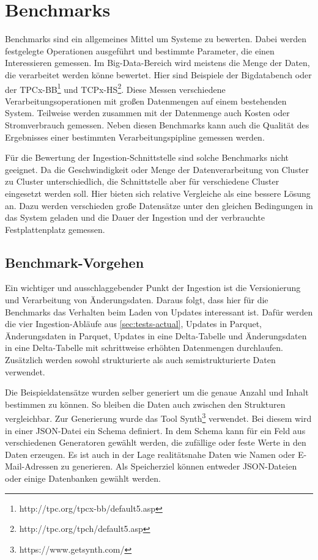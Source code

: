 \section{Benchmarks}

Benchmarks sind ein allgemeines Mittel um Systeme zu bewerten.
Dabei werden festgelegte Operationen ausgeführt und bestimmte Parameter, die einen Interessieren gemessen.
Im Big-Data-Bereich wird meistens die Menge der Daten, die verarbeitet werden könne bewertet.
Hier sind Beispiele der Bigdatabench \parencite{bigdatabench} oder der TPCx-BB\footnote{http://tpc.org/tpcx-bb/default5.asp} und TCPx-HS\footnote{http://tpc.org/tpch/default5.asp}.
Diese Messen verschiedene Verarbeitungsoperationen mit großen Datenmengen auf einem bestehenden System.
Teilweise werden zusammen mit der Datenmenge auch Kosten oder Stromverbrauch gemessen.
Neben diesen Benchmarks kann auch die Qualität des Ergebnisses einer bestimmten Verarbeitungspipline gemessen werden.

Für die Bewertung der Ingestion-Schnittstelle sind solche Benchmarks nicht geeignet.
Da die Geschwindigkeit oder Menge der Datenverarbeitung von Cluster zu Cluster unterschiedlich, die Schnittstelle aber für verschiedene Cluster eingesetzt werden soll.
Hier bieten sich relative Vergleiche als eine bessere Lösung an.
Dazu werden verschieden große Datensätze unter den gleichen Bedingungen in das System geladen und die Dauer der Ingestion und der verbrauchte Festplattenplatz gemessen.

\subsection{Benchmark-Vorgehen}
Ein wichtiger und ausschlaggebender Punkt der Ingestion ist die Versionierung und Verarbeitung von Änderungsdaten.
Daraus folgt, dass hier für die Benchmarks das Verhalten beim Laden von Updates interessant ist.
Dafür werden die vier Ingestion-Abläufe aus \cref{sec:tests-actual}, Updates in Parquet, Änderungsdaten in Parquet, Updates in eine Delta-Tabelle und Änderungsdaten in eine Delta-Tabelle mit schrittweise erhöhten Datenmengen durchlaufen.
Zusätzlich werden sowohl strukturierte als auch semistrukturierte Daten verwendet.

Die Beispieldatensätze wurden selber generiert um die genaue Anzahl und Inhalt bestimmen zu können.
So bleiben die Daten auch zwischen den Strukturen vergleichbar.
Zur Generierung wurde das Tool Synth\footnote{https://www.getsynth.com/} verwendet.
Bei diesem wird in einer JSON-Datei ein Schema definiert.
In dem Schema kann für ein Feld aus verschiedenen Generatoren gewählt werden, die zufällige oder feste Werte in den Daten erzeugen.
Es ist auch in der Lage realitätsnahe Daten wie Namen oder E-Mail-Adressen zu generieren.
Als Speicherziel können entweder JSON-Dateien oder einige Datenbanken gewählt werden.

